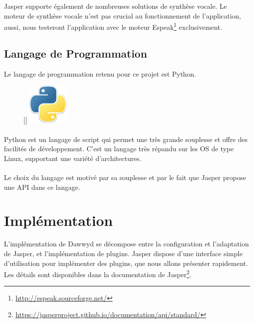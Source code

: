 \documentclass[12pt]{article}
\begin{document}
	    Jasper supporte également de nombreuses solutions de synthèse vocale. Le moteur de synthèse vocale n'est pas crucial au fonctionnement de l'application, aussi, nous testeront l'application avec le moteur Espeak\footnote{\url{http://espeak.sourceforge.net/}} exclusivement.
    
        \subsection{Langage de Programmation}

        Le langage de programmation retenu pour ce projet est Python.
                \begin{figure}
                	\centering
                	\raisebox{0pt}[\dimexpr{}\baselineskip\relax]{%
                        \includegraphics[width=2cm]{logo-python}%
                    }
                	\caption[Logo de Python]{}
                \end{figure}

        \paragraph{}
        Python est un langage de script qui permet une très grande souplesse et
        offre des facilités de développement. C'est un langage très répandu sur
        les OS de type Linux, supportant une variété d'architectures.

        \paragraph{}
        Le choix du langage est motivé par sa souplesse et par le fait que
        Jasper propose une API dans ce langage.

	\section{Implémentation}

	\FloatBarrier
		
		L'implémentation de Dawwyd se décompose entre la configuration et l'adaptation de Jasper, et l'implémentation de plugins. Jasper dispose d'une interface simple d'utilisation pour implémenter des plugins, que nous allons présenter rapidement. Les détails sont disponibles dans la documentation de Jasper\footnote{\url{https://jasperproject.github.io/documentation/api/standard/}}.
			
\end{document}
